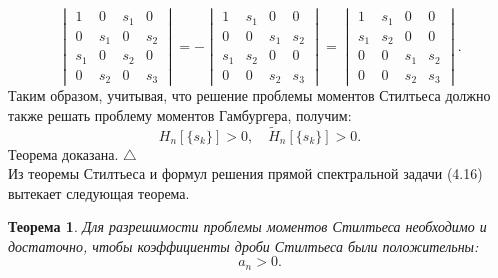 \documentclass[12pt,a4paper]{article}
\theoremstyle{plain}   \newtheorem{Pro}{Задача}
\newtheorem{The}{Теорема}
\begin{document}
\begin{equation*}
  \begin{vmatrix}
    1 & 0 & s_1 & 0 \\
	0 & s_1 & 0 & s_2 \\
	s_1 & 0 & s_2 & 0 \\
	0 & s_2 & 0 & s_3
  \end{vmatrix}
  =-
  \begin{vmatrix}
    1 & s_1 & 0 & 0 \\
	0 & 0 & s_1 & s_2 \\
	s_1 & s_2 & 0 & 0 \\
	0 & 0 & s_2 & s_3
  \end{vmatrix}
  =
  \begin{vmatrix}
    1 & s_1 & 0 & 0 \\
    s_1 & s_2 & 0 & 0 \\
    0 & 0 & s_1 & s_2 \\
    0 & 0 & s_2 & s_3
  \end{vmatrix}
  .
\end{equation*}
Таким образом, учитывая, что решение проблемы моментов
Стилтьеса должно также решать проблему моментов Гамбургера,
получим:
$$
  H_n [ \{ s_k \} ] >0, \quad
  \tilde H_n [ \{ s_k \} ] > 0.
$$
Теорема доказана. $ \triangle $ \\
Из теоремы Стилтьеса и формул решения прямой спектральной
задачи (4.16) вытекает следующая теорема.
\begin{The}
Для разрешимости проблемы моментов Стилтьеса
необходимо и достаточно, чтобы коэффициенты дроби Стилтьеса
были положительны:
$$
  a_n >0.
$$
\end{The}
\newpage
\end{document}
